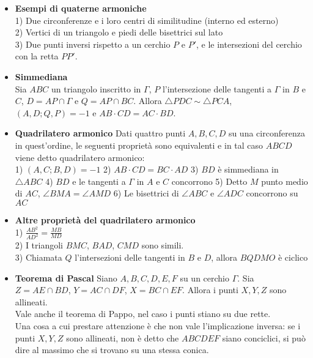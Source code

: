 \begin{itemize}
\item \textbf{Esempi di quaterne armoniche}\\
1) Due circonferenze e i loro centri di similitudine (interno ed esterno)\\
2) Vertici di un triangolo e piedi delle bisettrici sul lato\\
3) Due punti inversi rispetto a un cerchio $P$ e $P'$, e le intersezioni del cerchio con la retta $PP'$.

\item \textbf{Simmediana}\\
Sia $ABC$ un triangolo inscritto in $\Gamma$, $P$ l'intersezione delle tangenti a $\Gamma$ in $B$ e $C$, $D=AP\cap \Gamma$ e $Q=AP\cap BC$. Allora $\triangle PDC \sim \triangle PCA$, $(A,D;Q,P)=-1$ e $AB\cdot CD=AC\cdot BD$.

\item \textbf{Quadrilatero armonico}
Dati quattro punti $A,B,C,D$ su una circonferenza in quest'ordine, le seguenti proprietà sono equivalenti e in tal caso $ABCD$ viene detto quadrilatero armonico:\\
1) $(A,C;B,D)=-1$ \hspace{0.2cm} 2) $AB\cdot CD= BC\cdot AD$ \hspace{0.2cm} 3) $BD$ è simmediana in $\triangle ABC$ 4) $BD$ e le tangenti a $\Gamma$ in $A$ e $C$ concorrono \hspace{0.2cm}
5) Detto $M$ punto medio di $AC$, $\angle BMA=\angle AMD$  \hspace{0.2cm} 6) Le bisettrici di $\angle ABC$ e $\angle ADC$ concorrono su $AC$  

\item \textbf{Altre proprietà del quadrilatero armonico}\\
1) $\frac{AB^2}{AD^2}=\frac{MB}{MD}$\\
2) I triangoli $BMC$, $BAD$, $CMD$ sono simili.\\
3) Chiamata $Q$ l'intersezioni delle tangenti in $B$ e $D$, allora $BQDMO$ è ciclico

\item \textbf{Teorema di Pascal}
Siano $A,B,C,D,E,F$ su un cerchio $\Gamma$. Sia $Z=AE\cap BD$, $Y=AC\cap DF$, $X=BC\cap EF$. Allora i punti $X,Y,Z$ sono allineati.\\
Vale anche il teorema di Pappo, nel caso i punti stiano su due rette. \\
Una cosa a cui prestare attenzione è che non vale l'implicazione inversa: se i punti $X,Y,Z$ sono allineati, non è detto che $ABCDEF$ siano conciclici, si può dire al massimo che si trovano su una stessa conica.


\end{itemize}

